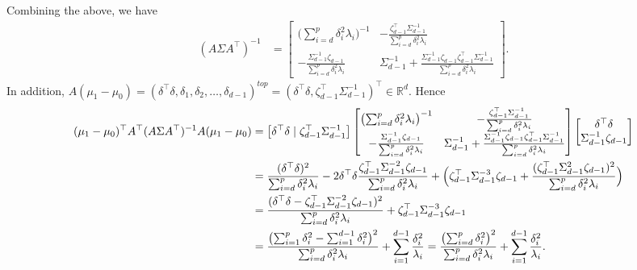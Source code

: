\documentclass[10pt]{article}
\begin{document}
Combining the above, we have
\begin{equation}
\begin{split}
(A \Sigma A^{\top})^{-1} &= \begin{bmatrix} \bigl(\sum_{i=d}^{p} \delta_i^{2} \lambda_i\bigr)^{-1} & - \frac{\zeta_{d-1}^{\top} \Sigma_{d-1}^{-1}}{\sum_{i=d}^{p} \delta_i^{2} \lambda_i} \\
 - \frac{\Sigma_{d-1}^{-1} \zeta_{d-1}}{\sum_{i=d}^{p} \delta_i^{2} \lambda_i} 
  & \Sigma_{d-1}^{-1} + \frac{\Sigma_{d-1}^{-1} \zeta_{d-1} \zeta_{d-1}^{\top} \Sigma_{d-1}^{-1}}{\sum_{i=d}^{p} \delta_i^{2} \lambda_i}
\end{bmatrix}.
\end{split}
\end{equation}
In addition, $A(\mu_1 - \mu_0) = (\delta^{\top} \delta, \delta_1, \delta_2, \dots, \delta_{d-1})^{top} = (\delta^{\top} \delta, \zeta_{d-1}^{\top} \Sigma_{d-1}^{-1})^{\top} \in \mathbb{R}^{d}$. Hence
\begin{equation*} 
\begin{split}
(\mu_1 - \mu_0)^{\top} A^{\top} (A \Sigma A^{\top})^{-1} A (\mu_1 - \mu_0) &= 
\bigl[\delta^{\top} \delta \mid \zeta_{d-1}^{\top} \Sigma_{d-1}^{-1} \bigr] 
\begin{bmatrix} \bigl(\sum_{i=d}^{p} \delta_i^{2} \lambda_i\bigr)^{-1} & - \frac{\zeta_{d-1}^{\top} \Sigma_{d-1}^{-1}}{\sum_{i=d}^{p} \delta_i^{2} \lambda_i} \\
 - \frac{\Sigma_{d-1}^{-1} \zeta_{d-1}}{\sum_{i=d}^{p} \delta_i^{2} \lambda_i} 
  & \Sigma_{d-1}^{-1} + \frac{\Sigma_{d-1}^{-1} \zeta_{d-1} \zeta_{d-1}^{\top} \Sigma_{d-1}^{-1}}{\sum_{i=d}^{p} \delta_i^{2} \lambda_i} \end{bmatrix} \begin{bmatrix} \delta^{\top} \delta \\ \Sigma_{d-1}^{-1} \zeta_{d-1} \end{bmatrix} \\
  &= \frac{(\delta^{\top} \delta)^{2}}{\sum_{i=d}^{p} \delta_i^{2} \lambda_i} - 2 \delta^{\top} \delta \frac{\zeta_{d-1}^{\top} \Sigma_{d-1}^{-2} \zeta_{d-1}}{\sum_{i=d}^{p} \delta_i^2 \lambda_i} + \Bigl(\zeta_{d-1}^{\top} \Sigma_{d-1}^{-3} \zeta_{d-1} + \frac{(\zeta_{d-1}^{\top} \Sigma_{d-1}^{2} \zeta_{d-1})^{2}}{\sum_{i=d}^{p} \delta_i^{2} \lambda_i} \Bigr) \\
  &= \frac{(\delta^{\top} \delta - \zeta_{d-1}^{\top} \Sigma_{d-1}^{-2} \zeta_{d-1})^{2}}{\sum_{i=d}^{p} \delta_i^{2} \lambda_i} + \zeta_{d-1}^{\top} \Sigma_{d-1}^{-3} \zeta_{d-1} \\
  &= \frac{\bigl(\sum_{i=1}^{p} \delta_i^{2} - \sum_{i=1}^{d-1} \delta_i^{2}\bigr)^{2}}{\sum_{i=d}^{p} \delta_i^{2} \lambda_i} + \sum_{i=1}^{d-1} \frac{\delta_i^{2}}{\lambda_i} = \frac{\bigl(\sum_{i=d}^{p} \delta_i^{2}\bigr)^{2}}{\sum_{i=d}^{p} \delta_i^{2} \lambda_i} + \sum_{i=1}^{d-1} \frac{\delta_i^{2}}{\lambda_i}.
\end{split}
\end{equation*}
\end{document}
